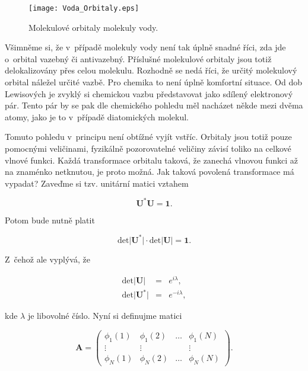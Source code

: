 \begin{figure} [htb]
\centering
\texttt{[image: Voda\_Orbitaly.eps]}
\caption{Molekulové orbitaly molekuly vody.}
\label{obr:Voda_Orbitaly}
\end{figure}

 
Všimněme si, že v~případě molekuly vody není tak úplně snadné říci, zda jde o~orbital vazebný či antivazebný. Příslušné molekulové orbitaly jsou totiž delokalizovány přes celou molekulu. Rozhodně se nedá říci, že určitý molekulový orbital náležel určité vazbě. Pro chemika to není úplně komfortní situace. Od dob Lewisových je zvyklý si chemickou vazbu představovat jako sdílený elektronový pár. Tento pár by se pak dle chemického pohledu měl nacházet někde mezi dvěma atomy, jako je to v~případě diatomických molekul. 

Tomuto pohledu v~principu není obtížné vyjít vstříc. Orbitaly jsou totiž pouze pomocnými veličinami, fyzikálně pozorovatelné veličiny závisí toliko na celkové vlnové funkci. Každá transformace orbitalu taková, že zanechá vlnovou funkci až na znaménko netknutou, je proto možná. Jak taková povolená transformace má vypadat? Zaveďme si tzv. unitární matici vztahem

\begin{equation}
\mathbf{U}^{\ast} \mathbf{U} = \mathbf{1}.
\label{rov:ElStrukt-26}
\end{equation}

\noindent Potom bude nutně platit

\begin{equation}
\mbox{det} \vert \mathbf{U}^{\ast} \vert \cdot \mbox{det} \vert \mathbf{U} \vert = \mathbf{1}.
\label{rov:ElStrukt-27}
\end{equation}

\noindent Z~čehož ale vyplývá, že 

\begin{eqnarray}
\mbox{det} \vert \mathbf{U} \vert &=& e^{i\lambda}, \nonumber \\
\mbox{det} \vert \mathbf{U}^{\ast} \vert &=& e^{-i\lambda},
\label{rov:ElStrukt-28}
\end{eqnarray}


\noindent kde $\lambda$ je libovolné číslo. Nyní si definujme matici 


\begin{equation}
\mathbf{A}=
\begin{pmatrix}
\phi_1(1) & \phi_1(2) & \ldots & \phi_1(N) \\
\vdots & \vdots & & \vdots \\
\phi_N(1) & \phi_N (2) & \ldots & \phi_N(N)
\end{pmatrix}.
\label{rov:ElStrukt-29}
\end{equation}


